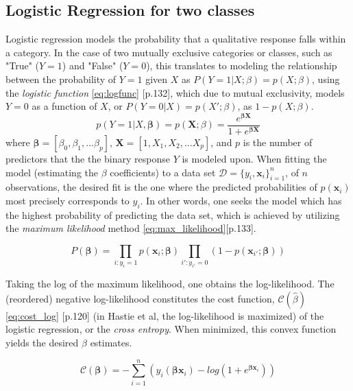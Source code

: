 \documentclass[%
oneside,                 %
final,                   %
10pt]{article}
\begin{document}
\subsection{Logistic Regression for two classes} \label{Section_M_Logreg}
Logistic regression models the probability that a qualitative response falls within a category. In the case of two mutually exclusive categories or classes, such as "True" ($Y=1$) and "False" ($Y=0$), this translates to modeling the relationship between the probability of $Y=1$ given $X$ as $P(Y=1|X;\beta)=p(X;\beta)$, using the \textit{logistic function} \eqref{eq:logfunc} \citep{2017introstatlearn}[p.132], which due to mutual exclusivity, models $Y=0$ as a function of $X$, or $P(Y=0|X)=p(X';\beta)$, as $1-p(X;\beta)$.
\begin{equation}
p(Y=1|X, \bm{\beta})= p(\bm{X};{\beta})=\frac{e^{\bm{\beta}\bm{X}}}{1+e^{\bm{\beta}\bm{X}}}
\label{eq:logfunc}
\end{equation}
where $\bm{\beta}=[\beta_0, \beta_1, ... \beta_p]$, $\bm{X}=[1,X_1, X_2, ... X_p]$, and $p$ is the number of predictors that the the binary response $Y$ is modeled upon. When fitting the model (estimating the $\beta$ coefficients) to a data set $\mathcal{D}=\{y_i,\bm{x}_i\}_{i=1}^n$, of $n$ observations, the desired fit is the one where the predicted probabilities of $p(\bm{x}_i)$  most precisely corresponds to $y_i$. In other words, one seeks the model which has the highest probability of predicting the data set, which is achieved by utilizing the \textit{maximum likelihood} method \eqref{eq:max_likelihood}\citep{2017introstatlearn}[p.133]. 



\begin{equation}
P(\bm{\beta})=\displaystyle\prod_{i:y_i=1}p(\bm{x}_i; \bm{\beta}) \displaystyle\prod_{i':y_{i'}=0}(1-p(\bm{x}_{i'}; \bm{\beta}))
\label{eq:max_likelihood}
\end{equation}

Taking the log of the maximum likelihood, one obtains the log-likelihood. The (reordered) negative log-likelihood constitutes the cost function, $\mathcal{C}(\hat {{\beta}})$ \eqref{eq:cost_log} \citep{HastieTrevor2009TEoS}[p.120] (in Hastie et al, the log-likelihood is maximized) of the logistic regression, or the \textit{cross entropy}. When minimized, this convex function yields the desired $\beta$ estimates.

\begin{equation}
\mathcal{C}(\bm{\beta})=-\sum_{i=1}^n \left(y_i({\bm{\beta}}\bm{x}_i)-log(1+e^{{\bm{\beta}}\bm{x}_i})\right)
\label{eq:cost_log}
\end{equation}
\end{document}
